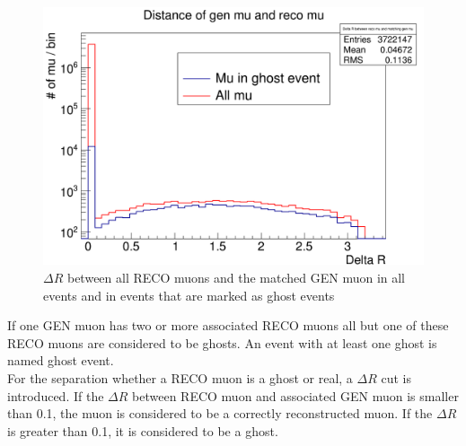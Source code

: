 \begin{figure}[b]
\centering
\begin{minipage}[t]{0.95\textwidth}
\includegraphics[width=\textwidth]{Figures/scheuch/Trennung.png}
\caption{$\Delta R$ between all RECO muons and the matched GEN muon in all events and in events that are marked as ghost events}
\label{DeltaRDistribution}
\end{minipage}
\end{figure}
If one GEN muon has two or more associated RECO muons all but one of these RECO muons are considered to be ghosts. An event with at least one ghost is named ghost event.\\
For the separation whether a RECO muon is a ghost or real, a $\Delta R$ cut is introduced. If the $\Delta R$ between RECO muon and associated GEN muon is smaller than 0.1, the muon is considered to be a correctly reconstructed muon. If the $\Delta R$ is greater than 0.1, it is considered to be a ghost.


